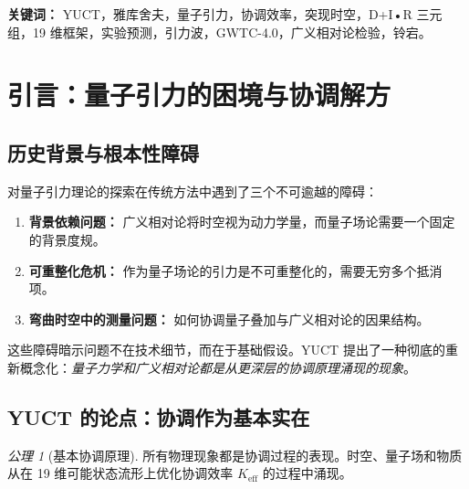 \documentclass[11pt,a4paper]{article}
\theoremstyle{remark}
\newtheorem{axiom}[theorem]{公理}
\newcommand{\Keff}{K_{\mathrm{eff}}}
\begin{document}
\begin{titlepage}
\begin{center}
			\vspace{0cm}
			
			\noindent
			\textbf{关键词：} YUCT，雅库舍夫，量子引力，协调效率，突现时空，D+I•R 三元组，19 维框架，实验预测，引力波，GWTC-4.0，广义相对论检验，铃宕。
			
			\vspace{0.5cm}
			
		\end{center}
	\end{titlepage}
	
	\tableofcontents
	\newpage
	
	\section{引言：量子引力的困境与协调解方}
	\label{sec:introduction}
	
	\subsection{历史背景与根本性障碍}
	
	对量子引力理论的探索在传统方法中遇到了三个不可逾越的障碍：
	
	\begin{enumerate}
		\item \textbf{背景依赖问题：} 广义相对论将时空视为动力学量，而量子场论需要一个固定的背景度规。
		
		\item \textbf{可重整化危机：} 作为量子场论的引力是不可重整化的，需要无穷多个抵消项。
		
		\item \textbf{弯曲时空中的测量问题：} 如何协调量子叠加与广义相对论的因果结构。
	\end{enumerate}
	
	这些障碍暗示问题不在技术细节，而在于基础假设。YUCT 提出了一种彻底的重新概念化：\emph{量子力学和广义相对论都是从更深层的协调原理涌现的现象}。
	
	\subsection{YUCT 的论点：协调作为基本实在}
	
	\begin{axiom}[基本协调原理]
		所有物理现象都是协调过程的表现。时空、量子场和物质从在 19 维可能状态流形上优化协调效率 $\Keff$ 的过程中涌现。
	\end{axiom}
	
\end{document}
